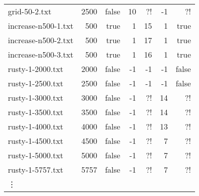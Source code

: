 \documentclass{tufte-handout}
\begin{document}
\begin{tabular}{lrrrrrr}
  grid-50-2.txt&	2500 &	false &	10 &	?! &	-1 &	?! &	\\
  increase-n500-1.txt&	500 &	true &	1 &	15 &	1 &	true &	\\
  increase-n500-2.txt&	500 &	true &	1 &	17 &	1 &	true &	\\
  increase-n500-3.txt&	500 &	true &	1 &	16 &	1 &	true &	\\
  rusty-1-2000.txt&	2000 &	false &	-1 &	-1 &	-1 &	false &	\\
  rusty-1-2500.txt&	2500 &	false &	-1 &	-1 &	-1 &	false &	\\
  rusty-1-3000.txt&	3000 &	false &	-1 &	?! &	14 &	?! &	\\
  rusty-1-3500.txt&	3500 &	false &	-1 &	?! &	14 &	?! &	\\
  rusty-1-4000.txt&	4000 &	false &	-1 &	?! &	13 &	?! &	\\
  rusty-1-4500.txt&	4500 &	false &	-1 &	?! &	7 &	?! &	\\
  rusty-1-5000.txt&	5000 &	false &	-1 &	?! &	7 &	?! &	\\
  rusty-1-5757.txt&	5757 &	false &	-1 &	?! &	7 &	?! &	\\
    \vdots
  \bottomrule
\end{tabular}
\end{document}
